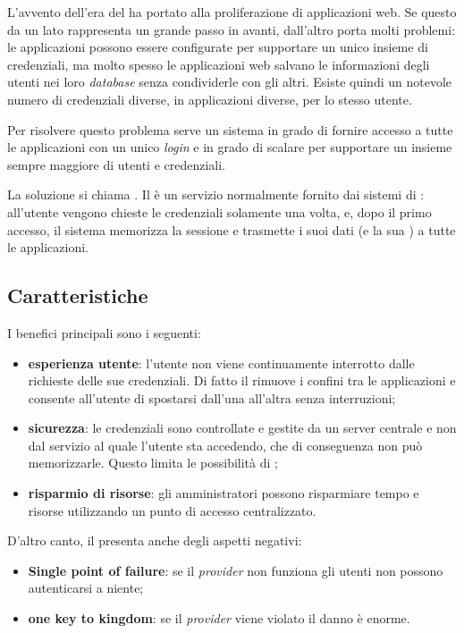 L'avvento dell'era del  ha portato alla proliferazione di applicazioni web. Se questo da un lato rappresenta un grande passo in avanti, dall'altro porta molti problemi: le applicazioni  possono essere configurate per supportare un unico insieme di credenziali, ma molto spesso le applicazioni web salvano le informazioni degli utenti nei loro \textit{database} senza condividerle con gli altri. Esiste quindi un notevole numero di credenziali diverse, in applicazioni diverse, per lo stesso utente. 

Per risolvere questo problema serve un sistema in grado di fornire accesso a tutte le applicazioni con un unico \textit{login} e in grado di scalare per supportare un insieme sempre maggiore di utenti e credenziali.

La soluzione si chiama . Il  è un servizio normalmente fornito dai sistemi di : all'utente vengono chieste le credenziali solamente una volta, e, dopo il primo accesso, il sistema memorizza la sessione e trasmette i suoi dati (e la sua ) a tutte le applicazioni. 

\subsection{Caratteristiche}
I benefici principali sono i seguenti:
\begin{itemize}
\item \textbf{esperienza utente}: l'utente non viene continuamente interrotto dalle richieste delle sue credenziali. Di fatto il  rimuove i confini tra le applicazioni e consente all'utente di spostarsi dall'una all'altra senza interruzioni;
\item \textbf{sicurezza}: le credenziali sono controllate e gestite da un server centrale e non dal servizio al quale l'utente sta accedendo, che di conseguenza non può memorizzarle. Questo limita le possibilità di ;
\item \textbf{risparmio di risorse}: gli amministratori possono risparmiare tempo e risorse utilizzando un punto di accesso centralizzato.
\end{itemize}

D'altro canto, il  presenta anche degli aspetti negativi:
\begin{itemize}
\item \textbf{Single point of failure}: se il \textit{provider}  non funziona gli utenti non possono autenticarsi a niente;
\item \textbf{one key to kingdom}: se il \textit{provider}  viene violato il danno è enorme.
\end{itemize}

